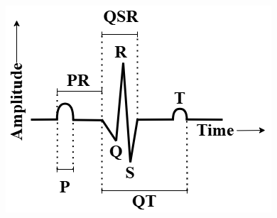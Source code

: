 \begin{figure}
	\centering
	\includegraphics[scale=0.5, keepaspectratio]{Images/ECG_Final_1.png} 
	\caption{}
\end{figure}
